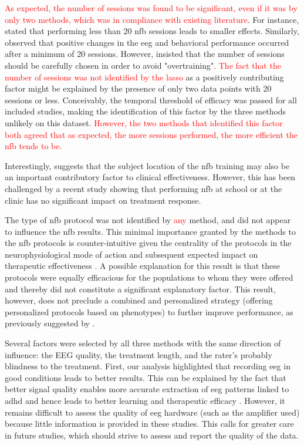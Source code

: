 \textcolor{red}{As expected, the number of sessions was found to be significant, even if it was by only two methods, which was in compliance with existing literature}.
For instance, \citet{Arns2014} stated that performing less than 20 \gls{nfb} sessions leads to smaller effects. Similarly, \citet{Vernon2004} 
observed that positive changes in the \gls{eeg} and behavioral performance occurred after a minimum of 20 sessions. However, \citet{Enriquez2017} 
insisted that the number of sessions should be carefully chosen in order to avoid "overtraining". \textcolor{red}{The fact that the number of sessions was not 
identified by the \gls{lasso}} as a positively contributing factor might be explained by the presence of only two data points with 20 sessions or less. 
Conceivably, the temporal threshold of efficacy was passed for all included studies, making the identification of this factor by the three methods unlikely on 
this dataset. \textcolor{red}{However, the two methods that identified this factor both agreed that as expected, the more sessions performed, 
the more efficient the \gls{nfb} tends to be.}

Interestingly, \citep{Minder2018} suggests that the subject location of the \gls{nfb} training may also be an important contributory 
factor to clinical effectiveness. However, this has been challenged by a recent study \citep{Minder2018} showing that 
performing \gls{nfb} at school or at the clinic has no significant impact on treatment response. 

The type of \gls{nfb} protocol was not identified by \textcolor{red}{any} method, and did not appear to influence the \gls{nfb} results. 
This minimal importance granted by the methods to the \gls{nfb} protocols is counter-intuitive given the centrality of the 
protocols in the neurophysiological mode of action and subsequent expected impact on
therapeutic effectiveness \citep{Vernon2004}. A possible explanation for this result is that these protocols were equally 
efficacious for the populations to whom they were offered and thereby did not constitute a significant explanatory factor. 
This result, however, does not preclude a combined and personalized strategy (offering personalized protocols based on phenotypes)
to further improve performance, as previously suggested by \citet{Alkoby2017}.

Several factors were selected by all three methods with the same direction of influence: the EEG quality, the treatment 
length, and the rater's probably blindness to the treatment. First, our analysis highlighted that recording \gls{eeg} 
in good conditions leads to better results.
This can be explained by the fact that better signal quality enables more accurate extraction of \gls{eeg} patterns
linked to \gls{adhd} and hence leads to better learning and therapeutic efficacy \citep{Congedo2004}. 
However, it remains difficult to assess the quality of \gls{eeg} hardware (such as the amplifier used) 
because little information is provided in these studies.  
This calls for greater care in future studies, which should strive to assess and report the quality of the data.

